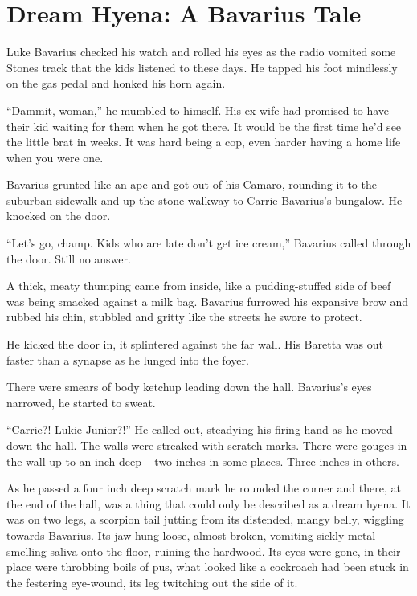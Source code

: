 \chapter[Dream Hyena]{Dream Hyena: A Bavarius Tale}





Luke Bavarius checked his watch and rolled his eyes as the radio
vomited some Stones track that the kids listened to these days. He
tapped his foot mindlessly on the gas pedal and honked his horn
again.



``Dammit, woman,'' he mumbled to himself. His ex-wife had promised to
have their kid waiting for them when he got there. It would be the
first time he'd see the little brat in weeks. It was hard being a
cop, even harder having a home life when you were one.



Bavarius grunted like an ape and got out of his Camaro, rounding it
to the suburban sidewalk and up the stone walkway to Carrie
Bavarius's bungalow. He knocked on the door.



``Let's go, champ. Kids who are late don't get ice cream,'' Bavarius
called through the door. Still no answer.



A thick, meaty thumping came from inside, like a pudding-stuffed
side of beef was being smacked against a milk bag. Bavarius
furrowed his expansive brow and rubbed his chin, stubbled and
gritty like the streets he swore to protect.



He kicked the door in, it splintered against the far wall. His
Baretta was out faster than a synapse as he lunged into the
foyer.



There were smears of body ketchup leading down the hall. Bavarius's
eyes narrowed, he started to sweat.



``Carrie?! Lukie Junior?!'' He called out, steadying his firing hand
as he moved down the hall. The walls were streaked with scratch
marks. There were gouges in the wall up to an inch deep -- two
inches in some places. Three inches in others.



As he passed a four inch deep scratch mark he rounded the corner
and there, at the end of the hall, was a thing that could only be
described as a dream hyena. It was on two legs, a scorpion tail
jutting from its distended, mangy belly, wiggling towards Bavarius.
Its jaw hung loose, almost broken, vomiting sickly metal smelling
saliva onto the floor, ruining the hardwood. Its eyes were gone, in
their place were throbbing boils of pus, what looked like a
cockroach had been stuck in the festering eye-wound, its leg
twitching out the side of it.



